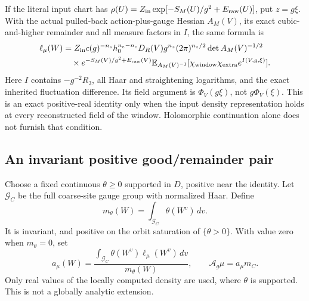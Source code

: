 If the literal input chart has
\(\rho(U)=Z_{\rm in}\exp[-S_M(U)/g^2+E_{\rm raw}(U)]\),
put \(z=g\xi\). With the actual pulled-back action-plus-gauge Hessian
\(A_M(V)\), its exact cubic-and-higher remainder and all measure factors
in \(I\), the same formula is
\begin{align}
 \ell_\mu(W)
 &=Z_{\rm in}c(g)^{-n_s}h_0^{n_e-n_c}D_R(V)
       g^{n_z}(2\pi)^{n_z/2}\det A_M(V)^{-1/2}\notag\\
 &\quad\times e^{-S_M(V)/g^2+E_{\rm raw}(V)}
 \mathbb E_{A_M(V)^{-1}}
       [\chi_{\rm window}\chi_{\rm extra}e^{I(V,g,\xi)}].
 \label{fps-gaussian-density}
\end{align}
Here \(I\) contains \(-g^{-2}R_3\), all Haar and straightening
logarithms, and the exact inherited fluctuation difference. Its field
argument is \(\Phi_V(g\xi)\), not \(g\Phi_V(\xi)\).
This is an exact positive-real identity only when the input density
representation holds at every reconstructed field of the window.
Holomorphic continuation alone does not furnish that condition.

\subsection{An invariant positive good/remainder pair}
\label{fps-invariant-section}

Choose a fixed continuous \(\theta\ge0\) supported in \(D\), positive
near the identity. Let \(\mathcal G_C\) be the full coarse-site gauge
group with normalized Haar. Define
\[
 m_\theta(W)=\int_{\mathcal G_C}\theta(W^v)\,dv.
\]
It is invariant, and positive on the orbit saturation of
\(\{\theta>0\}\). With value zero when \(m_\theta=0\), set
\begin{equation}
 a_\mu(W)=\frac{\int_{\mathcal G_C}
                   \theta(W^v)\ell_\mu(W^v)\,dv}{m_\theta(W)},
 \qquad \mathcal A_g\mu=a_\mu m_C.
 \label{fps-orbit-extension}
\end{equation}
Only real values of the locally computed density are used, where
\(\theta\) is supported. This is not a globally analytic extension.

